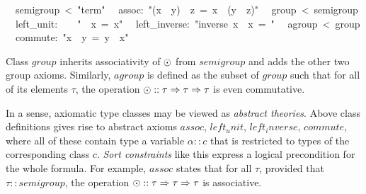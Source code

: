 \begin{isabelle}
\isanewline
~~semigroup~<~{"}term{"}\isanewline
~~assoc:~{"}(x~{\isasymOtimes}~y)~{\isasymOtimes}~z~=~x~{\isasymOtimes}~(y~{\isasymOtimes}~z){"}\isanewline
\isanewline
{}\isanewline
~~group~<~semigroup\isanewline
~~left\_unit:~~~~{"}{\isasymunit}~{\isasymOtimes}~x~=~x{"}\isanewline
~~left\_inverse:~{"}inverse~x~{\isasymOtimes}~x~=~{\isasymunit}{"}\isanewline
\isanewline
{}\isanewline
~~agroup~<~group\isanewline
~~commute:~{"}x~{\isasymOtimes}~y~=~y~{\isasymOtimes}~x{"}%
\begin{isamarkuptext}%
\noindent Class $group$ inherits associativity of $\odot$ from
 $semigroup$ and adds the other two group axioms. Similarly, $agroup$
 is defined as the subset of $group$ such that for all of its elements
 $\tau$, the operation $\odot :: \tau \Rightarrow \tau \Rightarrow \tau$ is even
 commutative.%
\end{isamarkuptext}%
%
%
\begin{isamarkuptext}%
In a sense, axiomatic type classes may be viewed as \emph{abstract
 theories}.  Above class definitions gives rise to abstract axioms
 $assoc$, $left_unit$, $left_inverse$, $commute$, where all of these
 contain type a variable $\alpha :: c$ that is restricted to types of
 the corresponding class $c$.  \emph{Sort constraints} like this
 express a logical precondition for the whole formula.  For example,
 $assoc$ states that for all $\tau$, provided that $\tau ::
 semigroup$, the operation $\odot :: \tau \Rightarrow \tau \Rightarrow \tau$ is
 associative.


\end{isamarkuptext}
\end{isabelle}
